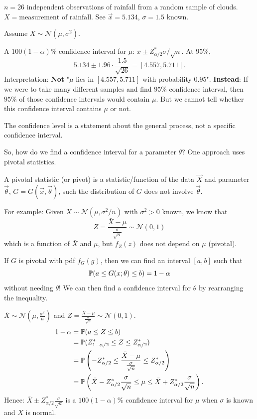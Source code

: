 \documentclass[10pt, a4paper]{article}
\begin{document}
\begin{example}
    $n = 26$ independent observations of rainfall from a random sample of clouds.
    $X = \text{measurement of rainfall}$.
    See $\vec{x} = 5.134$,
    $\sigma = 1.5$ known.

    Assume $X \sim \mathcal{N}(\mu, \sigma ^ 2)$.

    A $100(1 - \alpha)\%$ confidence interval for $\mu$:
    $\bar{x} \pm Z_{\alpha / 2}^{*}\sigma / \sqrt{n}$.
    At $95\%$,
    \[
    5.134 \pm 1.96 \cdot \frac{1.5}{\sqrt{26}} = [4.557, 5.711].
    \]
    Interpretation:
    \textbf{Not}
    "$\mu$ lies in $[4.557, 5.711]$ with probability $0.95$".
    \textbf{Instead}:
    If we were to take many different samples and find $95\%$ confidence interval,
    then $95\%$ of those confidence intervals would contain $\mu$.
    But we cannot tell whether this confidence interval contains $\mu$ or not.
\end{example}

The confidence level is a statement about the general process,
not a specific confidence interval.

So,
how do we find a confidence interval for a parameter $\theta$?
One approach uses pivotal statistics.

\begin{definition}
    A pivotal statistic
    (or pivot)
    is a statistic/function
    of the data $\vec{X}$ and parameter $\vec{\theta}$,
    $G = G(\vec{x}, \vec{\theta})$,
    such the distribution of $G$ does not involve $\vec{\theta}$.
\end{definition}

For example:
Given $\bar{X} \sim \mathcal{N}\left(\mu, \sigma ^ 2 / n\right)$ with $\sigma ^ 2 > 0$ known,
we know that
\[
Z = \frac{\bar{X} - \mu}{\frac{\sigma}{\sqrt{n}}} \sim \mathcal{N}(0, 1)
\]
which is a function of $\bar{X}$ and $\mu$,
but $f_{Z}(z)$ does not depend on $\mu$
(pivotal).

If $G$ is pivotal with pdf $f_{G}(g)$,
then we can find an interval $[a, b]$ such that
\[
\P(a \leq G(x; \theta) \leq b) = 1 - \alpha
\]
without needing $\theta$!
We can then find a confidence interval for $\theta$ by rearranging the inequality.

\begin{example}
    $\bar{X} \sim \mathcal{N}\left(\mu, \frac{\sigma ^ 2}{n}\right)$ and $Z = \frac{\bar{X} - \mu}{\frac{\sigma}{\sqrt{n}}} \sim \mathcal{N}(0, 1)$.
    \begin{align*}
        1 - \alpha &= \P(a \leq Z \leq b) \\
        &= \P(Z_{1 - \alpha / 2}^{*} \leq Z \leq Z_{\alpha / 2}^{*}) \\
        &= \P\left(-Z_{\alpha / 2}^{*} \leq \frac{\bar{X} - \mu}{\frac{\sigma}{\sqrt{n}}} \leq Z_{\alpha / 2}^{*}\right) \\
        &= \P\left(\bar{X} - Z_{\alpha / 2}^{*}\frac{\sigma}{\sqrt{n}} \leq \mu \leq \bar{X} + Z_{\alpha / 2}^{*}\frac{\sigma}{\sqrt{n}}\right).
    \end{align*}
    Hence:
    $\bar{X} \pm Z_{\alpha / 2}^{*}\frac{\sigma}{\sqrt{n}}$ is a $100(1 - \alpha)\%$ confidence interval for $\mu$ when $\sigma$ is known and $X$ is normal.
\end{example}
\end{document}
